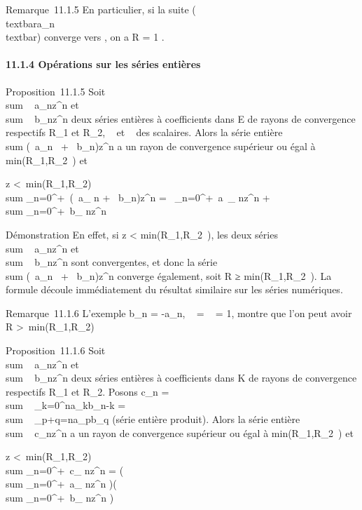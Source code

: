 \documentclass[]{article}
\begin{document}
Remarque~11.1.5 En particulier, si la suite
(\rootn\of\\textbar{}a\_n\\textbar{})
converge vers \ell, on a R = 1 \over \ell .

\paragraph{11.1.4 Opérations sur les séries entières}

Proposition~11.1.5 Soit
\\sum ~
a\_nz^n et
\\sum ~
b\_nz^n deux séries entières à coefficients dans E de
rayons de convergence respectifs R\_1 et R\_2, \alpha~ et \beta~
des scalaires. Alors la série entière
\\sum  (\alpha~a\_n~ +
\beta~b\_n)z^n a un rayon de convergence supérieur ou égal
à min(R\_1,R\_2~) et

\textbar{}z\textbar{} \textless{}\
min(R\_1,R\_2) \rigtharrow~\\sum
\_n=0^+\infty~(\alpha~a\_ n + \beta~b\_n)z^n =
\alpha~\sum \_n=0^+\infty~a~\_
nz^n + \beta~\\sum
\_n=0^+\infty~b\_ nz^n

Démonstration En effet, si \textbar{}z\textbar{}
\textless{} min(R\_1,R\_2~),
les deux séries \\sum ~
a\_nz^n et
\\sum ~
b\_nz^n sont convergentes, et donc la série
\\sum  (\alpha~a\_n~ +
\beta~b\_n)z^n converge également, soit R
≥ min(R\_1,R\_2~). La formule
découle immédiatement du résultat similaire sur les séries numériques.

Remarque~11.1.6 L'exemple b\_n = -a\_n, \alpha~ = \beta~ = 1,
montre que l'on peut avoir R \textgreater{}\
min(R\_1,R\_2)

Proposition~11.1.6 Soit
\\sum ~
a\_nz^n et
\\sum ~
b\_nz^n deux séries entières à coefficients dans K de
rayons de convergence respectifs R\_1 et R\_2. Posons
c\_n = \\sum ~
\_k=0^na\_kb\_n-k
= \\sum ~
\_p+q=na\_pb\_q (série entière produit). Alors la
série entière \\sum ~
c\_nz^n a un rayon de convergence supérieur ou égal à
min(R\_1,R\_2~) et

\textbar{}z\textbar{} \textless{}\
min(R\_1,R\_2) \rigtharrow~\\sum
\_n=0^+\infty~c\_ nz^n =
\left (\\sum
\_n=0^+\infty~a\_ nz^n\right
)\left (\\sum
\_n=0^+\infty~b\_ nz^n\right
)
\end{document}
